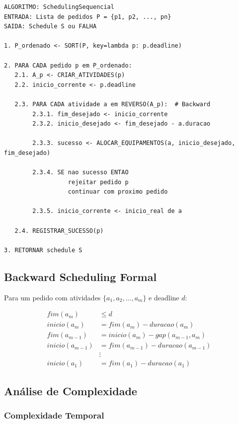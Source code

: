 \documentclass[11pt,a4paper]{article}
\begin{document}
\begin{lstlisting}[caption={Algoritmo Scheduling Sequencial}]
ALGORITMO: SchedulingSequencial
ENTRADA: Lista de pedidos P = {p1, p2, ..., pn}
SAIDA: Schedule S ou FALHA

1. P_ordenado <- SORT(P, key=lambda p: p.deadline)

2. PARA CADA pedido p em P_ordenado:
   2.1. A_p <- CRIAR_ATIVIDADES(p)
   2.2. inicio_corrente <- p.deadline

   2.3. PARA CADA atividade a em REVERSO(A_p):  # Backward
        2.3.1. fim_desejado <- inicio_corrente
        2.3.2. inicio_desejado <- fim_desejado - a.duracao

        2.3.3. sucesso <- ALOCAR_EQUIPAMENTOS(a, inicio_desejado, fim_desejado)

        2.3.4. SE nao sucesso ENTAO
                  rejeitar pedido p
                  continuar com proximo pedido

        2.3.5. inicio_corrente <- inicio_real de a

   2.4. REGISTRAR_SUCESSO(p)

3. RETORNAR schedule S
\end{lstlisting}

\subsection{Backward Scheduling Formal}

Para um pedido com atividades $\{a_1, a_2, ..., a_m\}$ e deadline $d$:

\begin{align}
fim(a_m) &\leq d \\
inicio(a_m) &= fim(a_m) - duracao(a_m) \\
fim(a_{m-1}) &= inicio(a_m) - gap(a_{m-1}, a_m) \\
inicio(a_{m-1}) &= fim(a_{m-1}) - duracao(a_{m-1}) \\
&\vdots \\
inicio(a_1) &= fim(a_1) - duracao(a_1)
\end{align}

\subsection{Análise de Complexidade}

\subsubsection{Complexidade Temporal}
\end{document}
